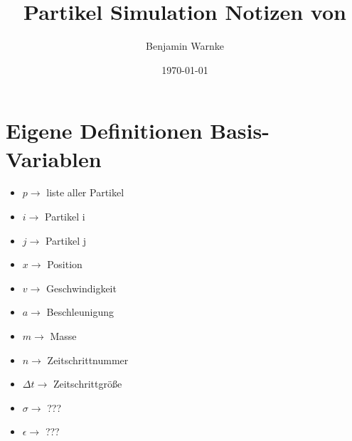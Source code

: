 \documentclass{article}
\title{Partikel Simulation Notizen von}
\author{Benjamin Warnke}
\date{\today}
\begin{document}
\maketitle
\begin{comment}
\section*{Skizze 1}

\setlength{\unitlength}{50pt}

\begin{picture}(0,0)
\linethickness{1pt} 
\put(0,-0){\line(+9,0){9}}
\put(0,-1){\line(+9,0){9}}
\put(0,-2){\line(+9,0){9}}
\put(0,-3){\line(+9,0){9}}
\put(0,-4){\line(+9,0){9}}
\put(0,-5){\line(+9,0){9}}
\put(0,-6){\line(+9,0){9}}
\put(0,-7){\line(+9,0){9}}
\put(0,-8){\line(+9,0){9}}
\put(0,-9){\line(+9,0){9}}
\put(+0,0){\line(0,-9){9}}
\put(+1,0){\line(0,-9){9}}
\put(+2,0){\line(0,-9){9}}
\put(+3,0){\line(0,-9){9}}
\put(+4,0){\line(0,-9){9}}
\put(+5,0){\line(0,-9){9}}
\put(+6,0){\line(0,-9){9}}
\put(+7,0){\line(0,-9){9}}
\put(+8,0){\line(0,-9){9}}
\put(+9,0){\line(0,-9){9}}
\linethickness{4pt} 
\put(4.5,-4.5){\line(0,+1){1}}
\put(4.5,-4.5){\line(1,+1){1}}
\put(4.5,-4.5){\line(1,+0){1}}
\put(4.5,-3.5){\line(1,-1){1}}
\end{picture}
\newpage
\end{comment}





\section*{Eigene Definitionen Basis-Variablen}
\begin{itemize}
	\item $p\rightarrow$ liste aller Partikel
	\item $i\rightarrow$ Partikel i
	\item $j\rightarrow$ Partikel j
	\item $x\rightarrow$ Position
	\item $v\rightarrow$ Geschwindigkeit
	\item $a\rightarrow$ Beschleunigung
	\item $m\rightarrow$ Masse
	\item $n\rightarrow$ Zeitschrittnummer
	\item $\Delta t\rightarrow$ Zeitschrittgröße
	\item $\sigma\rightarrow$ ???
	\item $\epsilon\rightarrow$ ???
\end{itemize}
\end{document}
